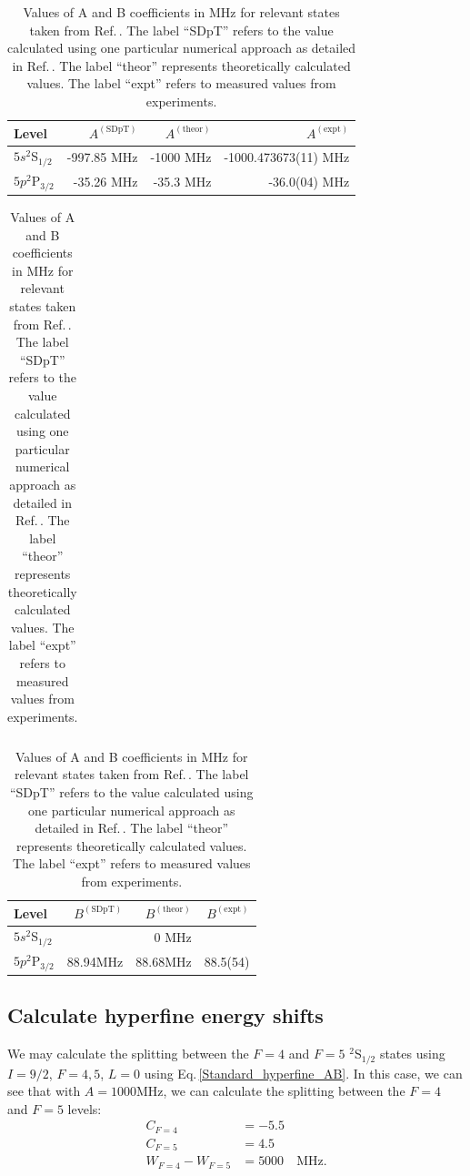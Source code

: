 \begin{table}[h]
\centering
\begin{tabular}{|l|r|r|r|}
\hline
Level &  $A^{\mathrm{(SDpT)}}$ &$A^{\mathrm{(theor)}}$ & $A^{\mathrm{(expt)}}$ \\ \hline \hline
$5s ^2$S$_{1/2}$&-997.85 MHz& -1000 MHz& -1000.473673(11) MHz\\ \hline
$5p ^2$P$_{3/2}$&-35.26 MHz&-35.3 MHz&-36.0(04) MHz\\ \hline
\end{tabular}

\begin{tabular}{l}
\end{tabular}

\begin{tabular}{|l|r|r|r|}
\hline
Level &  $B^{\mathrm{(SDpT)}}$ &$B^{\mathrm{(theor)}}$ & $B^{\mathrm{(expt)}}$ \\ \hline \hline
$5s ^2$S$_{1/2}$&&0  MHz&  \\ \hline
$5p ^2$P$_{3/2}$&88.94MHz&$88.68$MHz\footnotemark&88.5(54) \\ \hline
\end{tabular}
\caption{Values of A and B coefficients in MHz for relevant states taken from Ref.\,\cite{safronova2photon}. The label ``SDpT'' refers to the value calculated using one particular numerical approach as detailed in Ref.\,\cite{safronova2photon}. The label ``theor'' represents theoretically calculated values. The label ``expt'' refers to measured values from experiments.\label{AB_table}
}
\end{table}

\subsection{Calculate hyperfine energy shifts}
We may calculate the splitting between the $F=4$ and $F=5$ $^2$S$_{1/2}$ states using $I=9/2$, $F=4,5$, $L=0$ using Eq.\,\ref{Standard_hyperfine_AB}. In this case, we can see that with $A=1000$MHz, we can calculate the splitting between the $F=4$ and $F=5$ levels: 
\begin{align}
C_{F=4} &= -5.5\\
C_{F=5} &= 4.5\\
W_{F=4}-W_{F=5}&=5000 \quad \mathrm{MHz}.
\end{align}

